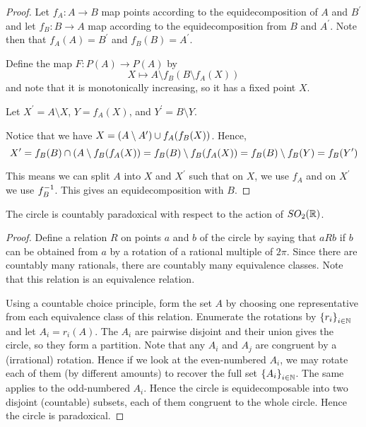 \documentclass[11pt]{article}
\begin{document}
\begin{proof}
    Let $f_A : A \to B$ map points according to the equidecomposition of $A$
    and $B^\prime$ and let $f_B : B \to A$ map according to the
    equidecomposition from $B$ and $A^\prime$.
    Note then that $f_A(A) = B^\prime$ and $f_B(B) = A^\prime$.

    Define the map $F : P(A) \to P(A)$ by
    \begin{equation*}
        X \mapsto A \setminus f_B(B \setminus f_A(X))
    \end{equation*}
    and note that it is monotonically increasing, so it has a fixed point $X$.

    Let $X^\prime = A \setminus X$, $Y = f_A(X)$, and
    $Y^\prime = B \setminus Y$.

    Notice that
    we have $X = (A \setminus A^\prime) \cup f_A(f_B(X))$.
    Hence,
    \begin{equation*}
        X^\prime
        = f_B(B) \cap (A \setminus f_B(f_A(X))
        = f_B(B) \setminus f_B(f_A(X))
        = f_B(B) \setminus f_B(Y)
        = f_B(Y^\prime)
    \end{equation*}

    This means we can split $A$ into $X$ and $X^\prime$ such that on $X$, we
    use $f_A$ and on $X^\prime$ we use $f_B^{-1}$. This gives an
    equidecomposition with $B$.
\end{proof}

\begin{prop}
    The circle is countably paradoxical with respect to the action of
    $SO_2(\mathbb{R})$.
\end{prop}

\begin{proof}
    Define a relation $R$ on points $a$ and $b$ of the circle by saying that
    $aRb$ if $b$ can be obtained from $a$ by a rotation of a rational multiple
    of $2\pi$. Since there are countably many rationals, there are countably
    many equivalence classes. Note that this relation is an equivalence
    relation.

    Using a countable choice principle, form the set $A$ by choosing one
    representative from each equivalence class of this relation.
    Enumerate the rotations by $\left\{r_i\right\}_{i\in\mathbb{N}}$ and let $A_i = r_i(A)$.
    The $A_i$ are pairwise disjoint and their union gives the circle, so they
    form a partition.
    Note that any $A_i$ and $A_j$ are congruent by a (irrational) rotation.
    Hence if we look at the even-numbered $A_i$, we may rotate each of them (by
    different amounts) to recover the full set $\left\{A_i\right\}_{i\in\mathbb{N}}$.
    The same applies to the odd-numbered $A_i$. Hence the circle is
    equidecomposable into two disjoint (countable) subsets, each of them
    congruent to the whole circle.
    Hence the circle is paradoxical.
\end{proof}
\end{document}
